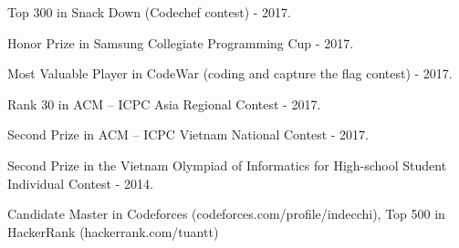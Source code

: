 
\begin{cvitems} %
  \item {Top 300 in Snack Down (Codechef contest) - 2017.}
  \item {Honor Prize in Samsung Collegiate Programming Cup - 2017.}
  \item {Most Valuable Player in CodeWar (coding and capture the flag contest) - 2017.}
  \item {Rank 30 in ACM – ICPC Asia Regional Contest - 2017.}
  \item {Second Prize in ACM – ICPC Vietnam National Contest - 2017.}
  \item {Second Prize in the Vietnam Olympiad of Informatics for High-school Student Individual Contest - 2014.}
  \item {Candidate Master in Codeforces (codeforces.com/profile/indecchi), Top 500 in HackerRank (hackerrank.com/tuantt)}
\end{cvitems}


